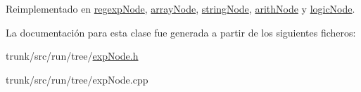 Reimplementado en \hyperlink{classregexpNode_a223644545a3ec0258c6083fa8686a3cb}{regexp\-Node}, \hyperlink{classarrayNode_a3e5771d0cf67476bfe19683d504327d1}{array\-Node}, \hyperlink{classstringNode_adbc47d59c690cbd5a231d9a44384e1ba}{string\-Node}, \hyperlink{classarithNode_a01f251d6cdc918309873c7443c694510}{arith\-Node} y \hyperlink{classlogicNode_a5a5daf0f2b1295126998ac3a9fe0cc77}{logic\-Node}.



La documentación para esta clase fue generada a partir de los siguientes ficheros\-:\begin{DoxyCompactItemize}
\item 
trunk/src/run/tree/\hyperlink{expNode_8h}{exp\-Node.\-h}\item 
trunk/src/run/tree/exp\-Node.\-cpp\end{DoxyCompactItemize}

